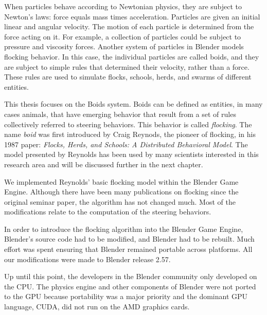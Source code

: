 

When particles behave  according to Newtonian physics, they are subject to Newton's laws: force equals mass times acceleration. Particles are given an initial linear and angular velocity. The motion of each particle is determined from the force acting on it. For example, a collection of particles could be subject to pressure and viscosity forces. Another system of particles in Blender models flocking behavior. In this case, the individual particles are called boids, and they are subject to simple rules that determined their velocity, rather than a force. These rules are used to simulate flocks, schools, herds, and swarms of different entities.

This thesis focuses on the Boids system. Boids can be defined as entities, in many cases animals, that have emerging behavior that result from a set of rules collectively referred to  steering behaviors. This behavior is called \textit{flocking}. The name \textit{boid} was first introduced by Craig Reynods, the pioneer of flocking, in his 1987 paper: \textit{Flocks, Herds, and Schools: A Distributed Behavioral Model}\cite{craig1}. The model presented by Reynolds has been used by many scientists interested in this research area and will be discussed further in the next chapter.

We implemented Reynolds' basic flocking model within the Blender Game Engine. Although there have been many publications on flocking since the original seminar paper, the algorithm has not changed much. Most of the modifications relate to the computation of the steering behaviors.

In order to introduce the flocking algorithm into the Blender Game Engine, Blender's source code had to be  modified, and Blender had to be rebuilt. Much effort was spent ensuring that Blender remained portable across platforms. All our modifications were made to Blender release 2.57. 



Up until this point, the developers in the Blender community only developed on the  CPU. The physics engine and other components of Blender were not ported to the GPU because portability was a major priority  and the dominant GPU language, CUDA, did not run on the AMD graphics cards.

